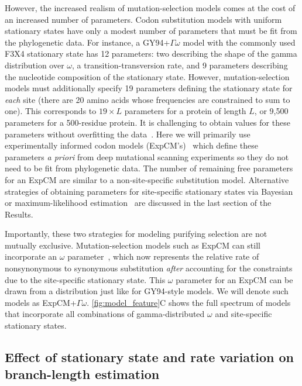 \documentclass[11pt]{article}
\begin{document}
However, the increased realism of mutation-selection models comes at the cost of an increased number of parameters. 
Codon substitution models with uniform stationary states have only a modest number of parameters that must be fit from the phylogenetic data.
For instance, a GY94+$\Gamma\omega$ model with the commonly used F3X4 stationary state has 12 parameters: two describing the shape of the gamma distribution over $\omega$, a transition-transversion rate, and 9 parameters describing the nucleotide composition of the stationary state.
However, mutation-selection models must additionally specify 19 parameters defining the stationary state for \emph{each} site (there are 20 amino acids whose frequencies are constrained to sum to one).
This corresponds to $19\times L$ parameters for a protein of length $L$, or 9,500 parameters for a 500-residue protein.
It is challenging to obtain values for these parameters without overfitting the data~\citep{rodrigue2013statistical}.
Here we will primarily use experimentally informed codon models (ExpCM's)~\citep{bloom2014experimentally, hilton2017phydms, bloom2017identification} which define these parameters \textit{a priori} from deep mutational scanning experiments so they do not need to be fit from phylogenetic data.
The number of remaining free parameters for an ExpCM are similar to a non-site-specific substitution model.
Alternative strategies of obtaining parameters for site-specific stationary states via Bayesian \citep{lartillot2004bayesian, rodrigue2014site} or maximum-likelihood estimation~\citep{si2008empirical} are discussed in the last section of the Results.

Importantly, these two strategies for modeling purifying selection are not mutually exclusive.
Mutation-selection models such as ExpCM can still incorporate an $\omega$ parameter~\citep{haddox2017mapping}, which now represents the relative rate of nonsynonymous to synonymous substitution \emph{after} accounting for the constraints due to the site-specific stationary state.
This $\omega$ parameter for an ExpCM can be drawn from a distribution just like for GY94-style models. 
We will denote such models as ExpCM+$\Gamma\omega$.
\ref{fig:model_feature}C shows the full spectrum of models that incorporate all combinations of gamma-distributed $\omega$ and site-specific stationary states.

\subsection*{Effect of stationary state and rate variation on branch-length estimation}
\end{document}

